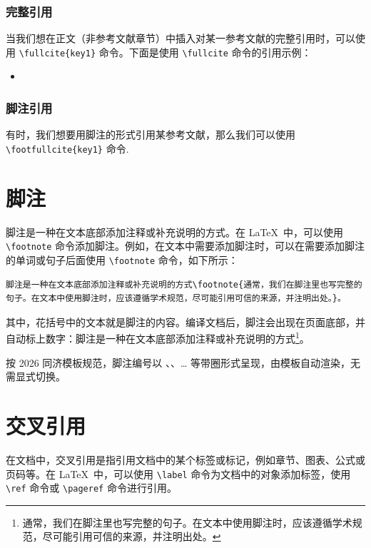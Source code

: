 \subsubsection{完整引用}

当我们想在正文（非参考文献章节）中插入对某一参考文献的完整引用时，可以使用 \verb|\fullcite{key1}| 命令。下面是使用 \verb|\fullcite| 命令的引用示例：

\begin{itemize}
    \item {}
\end{itemize}

\subsubsection{脚注引用}

有时，我们想要用脚注的形式引用某参考文献，那么我们可以使用 \verb|\footfullcite{key1}| 命令.
\fi


\section{脚注}

脚注是一种在文本底部添加注释或补充说明的方式。在 \LaTeX\ 中，可以使用 \verb|\footnote| 命令添加脚注。例如，在文本中需要添加脚注时，可以在需要添加脚注的单词或句子后面使用 \verb|\footnote| 命令，如下所示：

\begin{Verbatim}
脚注是一种在文本底部添加注释或补充说明的方式\footnote{通常，我们在脚注里也写完整的句子。在文本中使用脚注时，应该遵循学术规范，尽可能引用可信的来源，并注明出处。}。
\end{Verbatim}

其中，花括号中的文本就是脚注的内容。编译文档后，脚注会出现在页面底部，并自动标上数字：脚注是一种在文本底部添加注释或补充说明的方式\footnote{通常，我们在脚注里也写完整的句子。在文本中使用脚注时，应该遵循学术规范，尽可能引用可信的来源，并注明出处。}。

按 2026 同济模板规范，脚注编号以 、、… 等带圈形式呈现，由模板自动渲染，无需显式切换。

\section{交叉引用}

在文档中，交叉引用是指引用文档中的某个标签或标记，例如章节、图表、公式或页码等。在 \LaTeX\ 中，可以使用 \verb|\label| 命令为文档中的对象添加标签，使用 \verb|\ref| 命令或 \verb|\pageref| 命令进行引用。

